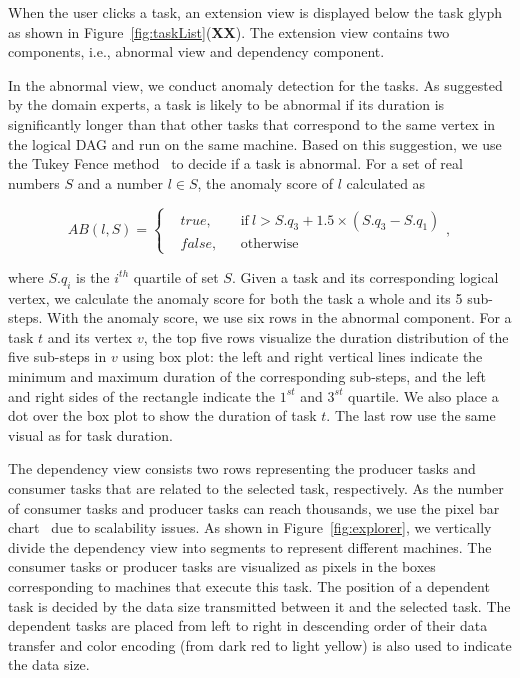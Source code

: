 



When the user clicks a task, an extension view is displayed below the task glyph as shown in Figure~\ref{fig:taskList}(\textbf{XX}). The extension view contains two components, i.e., abnormal view and dependency component. 

In the abnormal view, we conduct anomaly detection for the tasks. As suggested by the domain experts, a task is likely to be abnormal if its duration is significantly longer than that other tasks that correspond to the same vertex in the logical DAG and run on the same machine. Based on this suggestion, we use the Tukey Fence method~\cite{tukey1977exploratory} to decide if a task is abnormal. For a set of real numbers $S$ and a number $l \in S$, the anomaly score of $l$ calculated as

\begin{equation} 
	AB(l, S) = \left \{
	\begin{aligned}
		&true, && \text{if}\ l > S.q_3+1.5\times(S.q_3-S.q_1)\\
		&false, && \text{otherwise}
	\end{aligned} \right.,
\end{equation}

where $S.q_i$ is the $i^{th}$ quartile of set $S$. Given a task and its corresponding logical vertex, we calculate the anomaly score for both the task a whole and its 5 sub-steps. With the anomaly score, we use six rows in the abnormal component. For a task $t$ and its vertex $v$, the top five rows visualize the duration distribution of the five sub-steps in $v$ using box plot: the left and right vertical lines indicate the minimum and maximum duration of the corresponding sub-steps, and the left and right sides of the rectangle indicate the $1^{st}$ and $3^{st}$ quartile. We also place a dot over the box plot to show the duration of task $t$. The last row use the same visual as for task duration.

The dependency view consists two rows representing the producer tasks and consumer tasks that are related to the selected task, respectively. As the number of consumer tasks and producer tasks can reach thousands, we use the pixel bar chart~\cite{keim2002pixel} due to scalability issues. As shown in Figure~\ref{fig:explorer}, we vertically divide the dependency view into segments to represent different machines. 
The consumer tasks or producer tasks are visualized as pixels in the boxes corresponding to machines that execute this task. The position of a dependent task is decided by the data size transmitted between it and the selected task. The dependent tasks are placed from left to right in descending order of their data transfer and color encoding (from dark red to light yellow) is also used to indicate the data size. 

